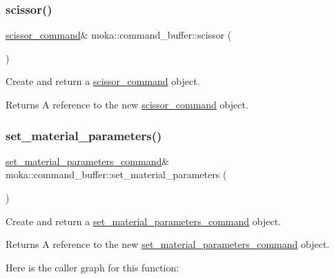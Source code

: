 \mbox{\label{classmoka_1_1command__buffer_a5185177f4b1c9606192a66a5804d30b9}} 
\subsubsection{\texorpdfstring{scissor()}{scissor()}}
{\footnotesize\ttfamily \mbox{\hyperlink{classmoka_1_1scissor__command}{scissor\+\_\+command}}\& moka\+::command\+\_\+buffer\+::scissor (\begin{DoxyParamCaption}{ }\end{DoxyParamCaption})}



Create and return a \mbox{\hyperlink{classmoka_1_1scissor__command}{scissor\+\_\+command}} object. 

\begin{DoxyReturn}{Returns}
A reference to the new \mbox{\hyperlink{classmoka_1_1scissor__command}{scissor\+\_\+command}} object. 
\end{DoxyReturn}
\mbox{\label{classmoka_1_1command__buffer_a5f727a7e4ff787fa3f222f680228afd9}} 
\subsubsection{\texorpdfstring{set\_material\_parameters()}{set\_material\_parameters()}}
{\footnotesize\ttfamily \mbox{\hyperlink{classmoka_1_1set__material__parameters__command}{set\+\_\+material\+\_\+parameters\+\_\+command}}\& moka\+::command\+\_\+buffer\+::set\+\_\+material\+\_\+parameters (\begin{DoxyParamCaption}{ }\end{DoxyParamCaption})}



Create and return a \mbox{\hyperlink{classmoka_1_1set__material__parameters__command}{set\+\_\+material\+\_\+parameters\+\_\+command}} object. 

\begin{DoxyReturn}{Returns}
A reference to the new \mbox{\hyperlink{classmoka_1_1set__material__parameters__command}{set\+\_\+material\+\_\+parameters\+\_\+command}} object. 
\end{DoxyReturn}
Here is the caller graph for this function\+:
\mbox{\label{classmoka_1_1command__buffer_a0c60e605038b5fe71beb200be502fb02}} 
